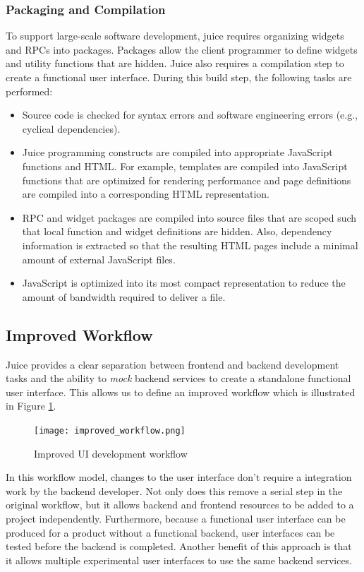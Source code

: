 \documentclass[10pt, twocolumn]{article}
\begin{document}
\subsubsection{Packaging and Compilation}

To support large-scale software development, juice requires
organizing widgets and RPCs into packages. Packages allow the
client programmer to define widgets and utility functions that are
hidden. Juice also requires a compilation step to create a
functional user interface. During this build step, the following
tasks are performed:

\begin{itemize}
\item Source code is checked for syntax errors and software
  engineering errors (e.g., cyclical dependencies).
\item Juice programming constructs are compiled into appropriate
  JavaScript functions and HTML. For example, templates are
  compiled into JavaScript functions that are optimized for
  rendering performance and page definitions are compiled into
  a corresponding HTML representation.
\item RPC and widget packages are compiled into source files that
  are scoped such that local function and widget definitions are
  hidden. Also, dependency information is extracted so that the
  resulting HTML pages include a minimal amount of external
  JavaScript files.
\item JavaScript is optimized into its most compact representation
  to reduce the amount of bandwidth required to deliver a file.
\end{itemize}

\subsection{Improved Workflow}

Juice provides a clear separation between frontend and backend
development tasks and the ability to \emph{mock} backend services
to create a standalone functional user interface. This allows us
to define an improved workflow which is illustrated in Figure
\ref{improved-workflow}.
\begin{figure}
  \centering
  \texttt{[image: improved\_workflow.png]}
  \caption{Improved UI development workflow}
  \label{improved-workflow}
\end{figure}

In this workflow model, changes to the user interface don't
require a integration work by the backend developer. Not only does
this remove a serial step in the original workflow, but it allows
backend and frontend resources to be added to a project
independently. Furthermore, because a functional user interface
can be produced for a product without a functional backend, user
interfaces can be tested before the backend is completed. Another
benefit of this approach is that it allows multiple experimental
user interfaces to use the same backend services.
\end{document}
